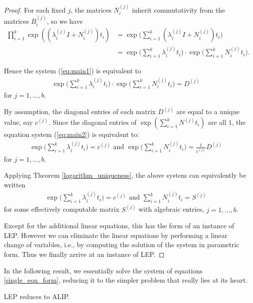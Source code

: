\begin{proof}
For each fixed $j$, the matrices $N_{i}^{(j)}$ inherit commutativity from
the matrices $B^{(j)}_{i}$, so we have
\begin{align*}
\prod\limits_{i=1}^{k} \exp((\lambda_i^{(j)}I + N_i^{(j)})t_{i}) &=
   \exp\big(\sum_{i=1}^k (\lambda_i^{(j)}I  +
 N_i^{(j)}) t_i \big)\\
&= \exp\big(\sum_{i=1}^k \lambda_i^{(j)} t_i\big) \cdot
   \exp\big(\sum_{i=1}^k N_i^{(j)} t_i \big) .
\end{align*}

Hence the system (\ref{eq:main1}) is equivalent to
\begin{align}
\exp\big(\sum_{i=1}^k \lambda_i^{(j)} t_i\big) \cdot
   \exp\big(\sum_{i=1}^k N_i^{(j)} t_i \big)  = D^{(j)}
\label{eq:main2}
\end{align}
for $j=1,\ldots,b$.

By assumption, the diagonal entries of each matrix $D^{(j)}$ are
equal to a unique value, say $c^{(j)}$.
Since the diagonal entries of
$\exp\left(\sum_{i=1}^kN^{(j)}t_i\right)$
are all $1$, the equation system (\ref{eq:main2}) is equivalent to:
\begin{align*}
\exp\big(\sum_{i=1}^k \lambda_i^{(j)} t_i\big)
= c^{(j)} \mbox{ and }\exp\big(\sum_{i=1}^k N_i^{(j)} t_i \big)
=\frac{1}{c^{(j)}} D^{(j)}
\end{align*}
for $j=1,\ldots,b$.

Applying Theorem \ref{logarithm_uniqueness}, the
above system can equivalently be written
\begin{align*}
\exp\big(\sum_{i=1}^k \lambda_i^{(j)} t_i\big)
= c^{(j)} \mbox{ and } \sum_{i=1}^k
N_i^{(j)} t_i =
S^{(j)}
\end{align*}
for  some effectively computable matrix
$S^{(j)}$ with algebraic entries, $j=1,\ldots,b$.

Except for the additional linear equations, this has the form of an
instance of LEP.
 However we can eliminate the linear equations by
performing a linear change of variables, i.e., by computing the
solution of the system in parametric form.  Thus we finally arrive at
an instance of LEP.
\end{proof}


In the following result, we essentially solve the system of equations \ref{single_eqn_form}, reducing it to the simpler problem that really lies at its heart.

\begin{theorem}
\label{reference-for-log}
LEP reduces to ALIP.
\end{theorem}

